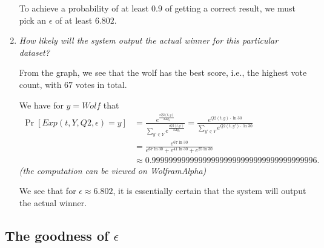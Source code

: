 \documentclass[parskip=half]{scrartcl}
\begin{document}
\begin{enumerate}
    To achieve a probability of at least $0.9$ of getting a correct result, we
    must pick an $\epsilon$ of at least $6.802$.

    \item \textit{How likely will the system output the actual winner for this
    particular dataset?}

    From the graph, we see that the wolf has the best score, i.e., the highest
    vote count, with $67$ votes in total.

    We have for $y = \textit{Wolf}$ that
    \begin{align*}
        \Pr[\textit{Exp}(t, Y, Q2, \epsilon) = y] &=
        \frac{e^\frac{\epsilon Q2(t, y)}{2\Delta q_2}}
        {\sum_{y'\in Y} e^\frac{\epsilon Q2(t, y')}{2\Delta q_2}}
        =
        \frac{e^{Q2(t, y) \cdot \ln{30}}}
        {\sum_{y'\in Y} e^{Q2(t, y') \cdot \ln{30}}}\\
        &=
        \frac{e^{67\ln{30}}}
        {
            e^{67\ln{30}} +
            e^{41\ln{30}} +
            e^{25\ln{30}}
        }\\
        &\approx 0.999999999999999999999999999999999999996.
    \end{align*}
    \textit{\footnotesize(the computation can be viewed on
    WolframAlpha\footnotemark{})}

    We see that for $\epsilon\approx 6.802$, it is essentially certain that
    the system will output the actual winner.


\end{enumerate}

\subsection{The goodness of \texorpdfstring{$\epsilon$}{ε}}
\end{document}
